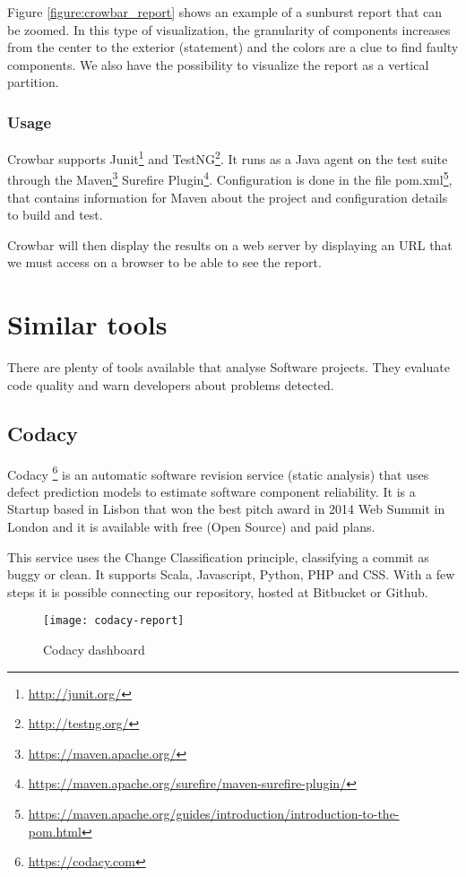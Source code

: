 Figure \ref{figure:crowbar_report} shows an example of a sunburst report that
can be zoomed. In this type of visualization, the granularity of components
increases from the center to the exterior (statement) and the colors are a clue
to find faulty components. We also have the possibility to visualize the report
as a vertical partition.

\subsubsection*{Usage}
Crowbar supports Junit\footnote{\url{http://junit.org/}} and
TestNG\footnote{\url{http://testng.org/}}. It runs as a Java agent on the test
suite through the Maven\footnote{\url{https://maven.apache.org/}} Surefire
Plugin\footnote{\url{https://maven.apache.org/surefire/maven-surefire-plugin/}}.
Configuration is done in the file pom.xml\footnote{\url{https://maven.apache.org/guides/introduction/introduction-to-the-pom.html}},
that contains information for Maven about the project and configuration details
to build and test.

Crowbar will then display the results on a web server by displaying an URL that
we must access on a browser to be able to see the report.

\section{Similar tools}
There are plenty of tools available that analyse Software projects. They
evaluate code quality and warn developers about problems detected.

\subsection{Codacy}

Codacy \footnote{\url{https://codacy.com}} is an automatic software revision
service (static analysis) that uses defect prediction models to estimate
software component reliability. It is a Startup based in Lisbon that won the
best pitch award in 2014 Web Summit in London and it is available with free
(Open Source) and paid plans.

This service uses the Change Classification principle, classifying a commit as
buggy or clean. It supports Scala, Javascript, Python, PHP and CSS. With a few
steps it is possible connecting our repository, hosted at Bitbucket or Github.

\begin{figure}[H]
    \begin{center}
        \texttt{[image: codacy-report]}
        \caption{Codacy dashboard}
        \label{figure:codacy_dashboard}
    \end{center}
\end{figure}

